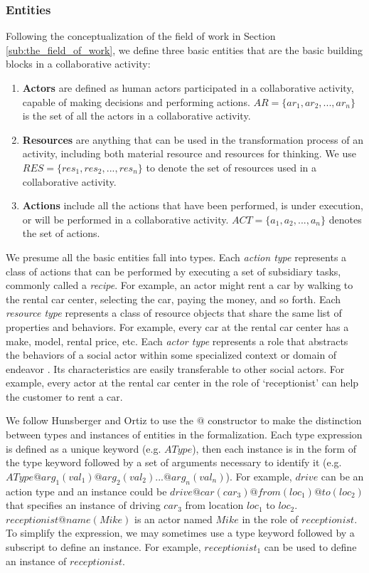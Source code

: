 \subsubsection{Entities} %
\label{ssub:entities}
Following the conceptualization of the field of work in Section \ref{sub:the_field_of_work}, 
we define three basic entities that are the basic building blocks in a collaborative activity:
\begin{enumerate}
    \item \textbf{Actors} are defined as human actors participated in a collaborative activity, capable of making decisions and performing actions. $AR=\{ar_1, ar_2, ..., ar_n\}$ is the set of all the actors in a collaborative activity.
    \item \textbf{Resources} are anything that can be used in the transformation process of an activity, including both material resource and resources for thinking. We use $RES=\{res_1, res_2, ..., res_n\}$ to denote the set of resources used in a collaborative activity.
	\item \textbf{Actions} include all the actions that have been performed, is under execution, or will be performed in a collaborative activity. $ACT=\{a_1, a_2, ..., a_n\}$ denotes the set of actions. 
\end{enumerate}

We presume all the basic entities fall into types. Each \emph{action type} represents a class of actions that can be performed by executing a set of subsidiary tasks, commonly called a \emph{recipe}. For example, an actor might rent a car by walking to the rental car center, selecting the car, paying the money, and so forth. Each \emph{resource type} represents a class of resource objects that share the same list of properties and behaviors. For example, every car at the rental car center has a make, model, rental price, etc. Each \emph{actor type} represents a role that abstracts the behaviors of a social actor within some specialized context or domain of endeavor \cite{Bresciani2004}. Its characteristics are easily transferable to other social actors. For example, every actor at the rental car center in the role of `receptionist' can help the customer to rent a car.

We follow Hunsberger and Ortiz \cite{Hunsberger} to use the $@$ constructor to make the distinction between types and instances of entities in the formalization. Each type expression is defined as a unique keyword (e.g. $AType$), then each instance is in the form of the type keyword followed by a set of arguments necessary to identify it (e.g. $AType@arg_1(val_1)@arg_2(val_2)...@arg_n(val_n)$). For example, $drive$ can be an action type and an instance could be $drive@car(car_3)@from(loc_1)@to(loc_2)$ that specifies an instance of driving $car_3$ from location $loc_1$ to $loc_2$. $receptionist@name(Mike)$ is an actor named $Mike$ in the role of $receptionist$. To simplify the expression, we may sometimes use a type keyword followed by a subscript to define an instance. For example, $receptionist_1$ can be used to define an instance of $receptionist$.

